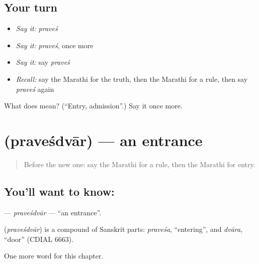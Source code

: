 \subsection*{Your turn}
\begin{itemize}
\raggedright
  \item \emph{Say it:} \emph{praveś}
  \item \emph{Say it:} \emph{praveś}, once more
  \item \emph{Say it:} say \emph{praveś}
  \item \emph{Recall:} say the Marathi for the truth, then the Marathi for a rule, then say \emph{praveś} again
\end{itemize}

\begin{tcolorbox}[breakable,colback=teal!4,colframe=teal!35!black,title={Before you move on}]
What does  mean? (\textquotedblleft{}Entry, admission\textquotedblright{}.) Say it once more.
\end{tcolorbox}
\section[\texorpdfstring{\mr{प्रवेशद्वार} (praveśdvār)}{प्रवेशद्वार (praveśdvār)}]{ (praveśdvār) — an entrance}

\label{lesson:MR-C240-pravesdvar}



\begin{quote}
Before the new one: say the Marathi for a rule, then the Marathi for entry.
\end{quote}

\subsection*{You'll want to know: }
\textbf{} — \emph{praveśdvār} — \textquotedblleft{}an entrance\textquotedblright{}.

\begin{cousinweb}
\textbf{} (\emph{praveśdvār}) is a compound of Sanskrit parts: \emph{praveśa}, \textquotedblleft{}entering\textquotedblright{}, and \emph{dvāra}, \textquotedblleft{}door\textquotedblright{} (CDIAL 6663).
\end{cousinweb}

\begin{grammarlens}[title={What you've built}]
One more word for this chapter.
\end{grammarlens}

